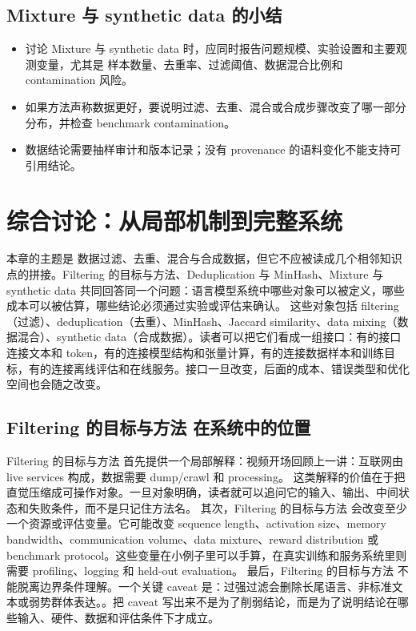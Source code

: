 \documentclass[a4paper]{article}
\begin{document}
\subsection{Mixture 与 synthetic data 的小结}
\begin{itemize}
\item 讨论 Mixture 与 synthetic data 时，应同时报告问题规模、实验设置和主要观测变量，尤其是 样本数量、去重率、过滤阈值、数据混合比例和 contamination 风险。
\item 如果方法声称数据更好，要说明过滤、去重、混合或合成步骤改变了哪一部分分布，并检查 benchmark contamination。
\item 数据结论需要抽样审计和版本记录；没有 provenance 的语料变化不能支持可引用结论。
\end{itemize}
\section{综合讨论：从局部机制到完整系统}
本章的主题是 数据过滤、去重、混合与合成数据，但它不应被读成几个相邻知识点的拼接。Filtering 的目标与方法、Deduplication 与 MinHash、Mixture 与 synthetic data 共同回答同一个问题：语言模型系统中哪些对象可以被定义，哪些成本可以被估算，哪些结论必须通过实验或评估来确认。
这些对象包括 filtering（过滤）、deduplication（去重）、MinHash、Jaccard similarity、data mixing（数据混合）、synthetic data（合成数据）。读者可以把它们看成一组接口：有的接口连接文本和 token，有的连接模型结构和张量计算，有的连接数据样本和训练目标，有的连接离线评估和在线服务。接口一旦改变，后面的成本、错误类型和优化空间也会随之改变。
\subsection{Filtering 的目标与方法 在系统中的位置}
Filtering 的目标与方法 首先提供一个局部解释：视频开场回顾上一讲：互联网由 live services 构成，数据需要 dump/crawl 和 processing。 这类解释的价值在于把直觉压缩成可操作对象。一旦对象明确，读者就可以追问它的输入、输出、中间状态和失败条件，而不是只记住方法名。
其次，Filtering 的目标与方法 会改变至少一个资源或评估变量。它可能改变 sequence length、activation size、memory bandwidth、communication volume、data mixture、reward distribution 或 benchmark protocol。这些变量在小例子里可以手算，在真实训练和服务系统里则需要 profiling、logging 和 held-out evaluation。
最后，Filtering 的目标与方法 不能脱离边界条件理解。一个关键 caveat 是：过强过滤会删除长尾语言、非标准文本或弱势群体表达。。把 caveat 写出来不是为了削弱结论，而是为了说明结论在哪些输入、硬件、数据和评估条件下才成立。
\end{document}
